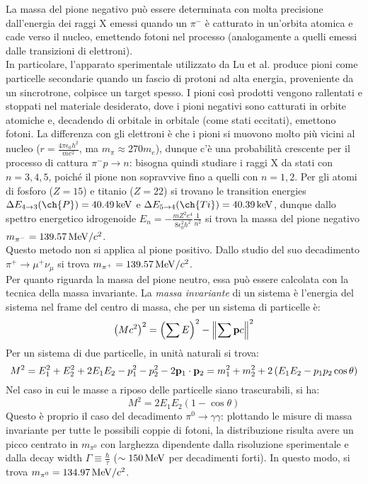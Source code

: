 La massa del pione negativo può essere determinata con molta precisione dall'energia dei raggi X emessi quando un $ \pi^- $ è catturato in un'orbita atomica e cade verso il nucleo, emettendo fotoni nel processo (analogamente a quelli emessi dalle transizioni di elettroni).\\
In particolare, l'apparato sperimentale utilizzato da Lu et al. produce pioni come particelle secondarie quando un fascio di protoni ad alta energia, proveniente da un sincrotrone, colpisce un target spesso. I pioni così prodotti vengono rallentati e stoppati nel materiale desiderato, dove i pioni negativi sono catturati in orbite atomiche e, decadendo di orbitale in orbitale (come stati eccitati), emettono fotoni. La differenza con gli elettroni è che i pioni si muovono molto più vicini al nucleo ($ r = \frac{4\pi \epsilon_0 h^2}{me^2} $, ma $ m_{\pi} \approx 270m_e $), dunque c'è una probabilità crescente per il processo di cattura $ \pi^- p \rightarrow n $: bisogna quindi studiare i raggi X da stati con $ n = 3,4,5 $, poiché il pione non sopravvive fino a quelli con $ n = 1,2 $. Per gli atomi di fosforo ($ Z = 15 $) e titanio ($ Z = 22 $) si trovano le transition energies $ \Delta E_{4\rightarrow3}(\ch{P}) = 40.49\kev $ e $ \Delta E_{5\rightarrow4}(\ch{Ti}) = 40.39\kev $, dunque dallo spettro energetico idrogenoide $ E_n = - \frac{m Z^2 e^4}{8 \epsilon_0^2 h^2} \frac{1}{n^2} $ si trova la massa del pione negativo $ m_{\pi^-} = 139.57\,\mathrm{MeV}/c^2 $.\\
Questo metodo non si applica al pione positivo. Dallo studio del suo decadimento $ \pi^+ \rightarrow \mu^+\nu_{\mu} $ si trova $ m_{\pi^+} = 139.57\,\mathrm{MeV}/c^2 $.\\
Per quanto riguarda la massa del pione neutro, essa può essere calcolata con la tecnica della massa invariante. La \textit{massa invariante} di un sistema è l'energia del sistema nel frame del centro di massa, che per un sistema di particelle è:
\begin{equation}
	\left( Mc^2 \right)^2 = \left( \sum E \right)^2 - \left\lVert\sum \mathbf{p} c\right\rVert^2
	\label{eq:9.3}
\end{equation}
Per un sistema di due particelle, in unità naturali si trova:
\begin{equation*}
	M^2 = E_1^2 + E_2^2 + 2E_1 E_2 - p_1^2 - p_2^2 - 2\mathbf{p}_1 \cdot \mathbf{p}_2 = m_1^2 + m_2^2 + 2\left( E_1 E_2 - p_1 p_2 \cos \theta \right)
\end{equation*}
Nel caso in cui le masse a riposo delle particelle siano trascurabili, si ha:
\begin{equation*}
	M^2 = 2 E_1 E_2 \left( 1 - \cos \theta \right)
\end{equation*}
Questo è proprio il caso del decadimento $ \pi^0 \rightarrow \gamma\gamma $: plottando le misure di massa invariante per tutte le possibili coppie di fotoni, la distribuzione risulta avere un picco centrato in $ m_{\pi^0} $ con larghezza dipendente dalla risoluzione sperimentale e dalla decay width $ \Gamma \equiv \frac{\hbar}{\tau} $ ($ \sim 150\,\mathrm{MeV} $ per decadimenti forti). In questo modo, si trova $ m_{\pi^0} = 134.97\,\mathrm{MeV}/c^2 $.

